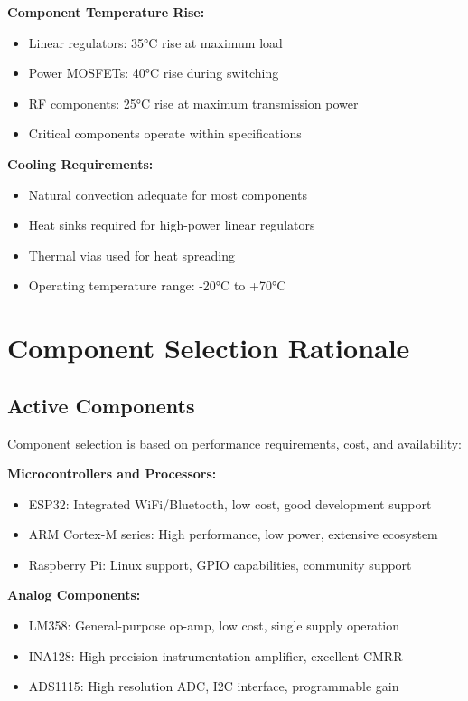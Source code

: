 \textbf{Component Temperature Rise:}
\begin{itemize}
\item Linear regulators: 35°C rise at maximum load
\item Power MOSFETs: 40°C rise during switching
\item RF components: 25°C rise at maximum transmission power
\item Critical components operate within specifications
\end{itemize}

\textbf{Cooling Requirements:}
\begin{itemize}
\item Natural convection adequate for most components
\item Heat sinks required for high-power linear regulators
\item Thermal vias used for heat spreading
\item Operating temperature range: -20°C to +70°C
\end{itemize}

\section{Component Selection Rationale}
\label{sec:component_selection}

\subsection{Active Components}
\label{subsec:active_components}

Component selection is based on performance requirements, cost, and availability:

\textbf{Microcontrollers and Processors:}
\begin{itemize}
\item ESP32: Integrated WiFi/Bluetooth, low cost, good development support
\item ARM Cortex-M series: High performance, low power, extensive ecosystem
\item Raspberry Pi: Linux support, GPIO capabilities, community support
\end{itemize}

\textbf{Analog Components:}
\begin{itemize}
\item LM358: General-purpose op-amp, low cost, single supply operation
\item INA128: High precision instrumentation amplifier, excellent CMRR
\item ADS1115: High resolution ADC, I2C interface, programmable gain
\end{itemize}

